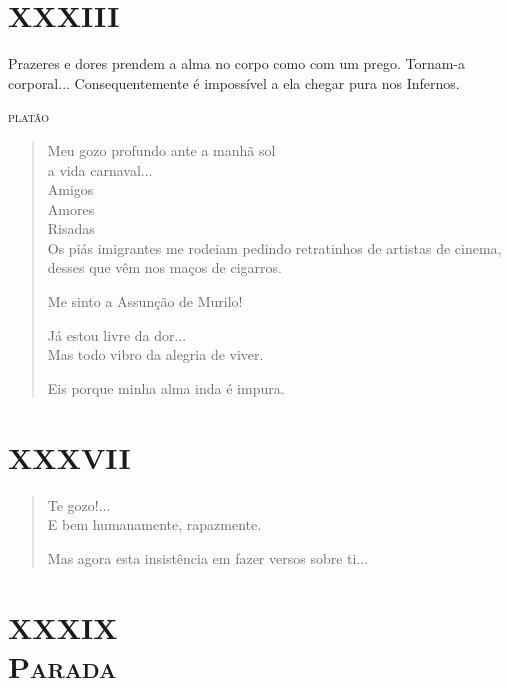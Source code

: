 \chapter[XXXIII -- ``Meu gozo profundo ante a manhã sol'']{XXXIII}

\epigraph{Prazeres e dores prendem a alma no corpo como com um prego. Tornam-a
corporal... Consequentemente é impossível a ela chegar pura nos
Infernos.}{\textsc{platão}}

\begin{verse}
Meu gozo profundo ante a manhã sol\\
\quad\quad\quad\quad{}a vida carnaval...\\
\quad\quad\quad{}Amigos\\
\quad\quad{}Amores\\
\quad{}Risadas\\
Os piás imigrantes me rodeiam pedindo retratinhos de artistas de cinema,
desses que vêm nos maços de cigarros.

Me sinto a Assunção de Murilo!

Já estou livre da dor...\\
Mas todo vibro da alegria de viver.

\quad{}Eis porque minha alma inda é impura.
\end{verse}

\chapter[XXXVII -- ``Te gozo!...'']{XXXVII}

\begin{verse}
Te gozo!...\\
E bem humanamente, rapazmente.

Mas agora esta insistência em fazer versos sobre ti...
\end{verse}

\chapter[XXXIX -- \textsc{Parada}]{XXXIX\\\textsc{Parada} }


